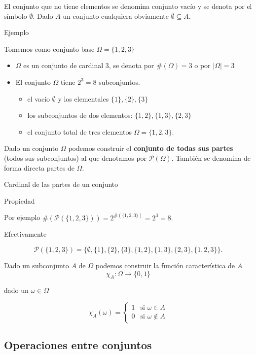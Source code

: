 \documentclass[
  letterpaper,
  DIV=11,
  numbers=noendperiod]{scrreprt}
\providecommand{\tightlist}{%
  \setlength{\itemsep}{0pt}\setlength{\parskip}{0pt}}\usepackage{longtable,booktabs,array}
\begin{document}
El conjunto que no tiene elementos se denomina conjunto vacío y se
denota por el símbolo \(\emptyset\). Dado \(A\) un conjunto cualquiera
obviamente \(\emptyset\subseteq A.\)

Ejemplo

Tomemos como conjunto base \(\Omega=\{1,2,3\}\)

\begin{itemize}
\tightlist
\item
  \(\Omega\) es un conjunto de cardinal 3, se denota por
  \(\#(\Omega)=3\) o por \(|\Omega|=3\)
\item
  El conjunto \(\Omega\) tiene \(2^3=8\) subconjuntos.

  \begin{itemize}
  \tightlist
  \item
    el vacío \(\emptyset\) y los elementales \(\{1\},\{2\},\{3\}\)
  \item
    los subconjuntos de dos elementos: \(\{1,2\},\{1,3\},\{2,3\}\)
  \item
    el conjunto total de tres elementos \(\Omega=\{1,2,3\}.\)
  \end{itemize}
\end{itemize}

Dado un conjunto \(\Omega\) podemos construir el \textbf{conjunto de
todas sus partes} (todos sus subconjuntos) al que denotamos por
\(\mathcal{P}(\Omega)\). También se denomina de forma directa partes de
\(\Omega\).

Cardinal de las partes de un conjunto

Propiedad

Por ejemplo
\(\#\left(\mathcal{P}(\{1,2,3\})\right)=2^{\#(\{1,2,3\})}=2^3=8.\)

Efectivamente

\[\mathcal{P}(\{1,2,3\})=\{\emptyset,\{1\},\{2\},\{3\},\{1,2\},\{1,3\},\{2,3\},\{1,2,3\}\}.\]

Dado un subconjunto \(A\) de \(\Omega\) podemos construir la función
característica de \(A\) \[\chi_A:\Omega \to \{0,1\}\]

dado un \(\omega\in \Omega\)

\[
\chi_A(\omega)=
\left\{
\begin{array}{ll}
1 &  \mbox{si }\omega \in A\\
0 &  \mbox{si }\omega \not\in A
\end{array}
\right.
\]

\subsection{Operaciones entre
conjuntos}\label{operaciones-entre-conjuntos}
\end{document}
